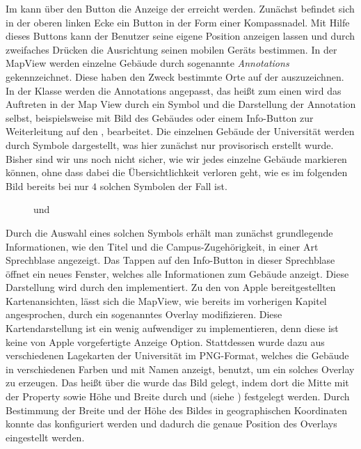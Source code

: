 \documentclass{report}
\begin{document}
Im  kann über den Button  die Anzeige der  erreicht werden. Zunächst befindet sich in der oberen linken Ecke ein Button in der Form einer Kompassnadel. Mit Hilfe dieses Buttons kann der Benutzer seine eigene Position anzeigen lassen und durch zweifaches Drücken die Ausrichtung seinen mobilen Geräts bestimmen. In der MapView werden einzelne Gebäude durch sogenannte \emph{Annotations} gekennzeichnet. Diese haben den Zweck bestimmte Orte auf der  auszuzeichnen. In der Klasse  werden die Annotations angepasst, das heißt zum einen wird das Auftreten in der Map View durch ein Symbol und die Darstellung der Annotation selbst, beispielsweise mit Bild des Gebäudes oder einem Info-Button zur Weiterleitung auf den , bearbeitet. Die einzelnen Gebäude der Universität werden durch Symbole dargestellt, was hier zunächst nur provisorisch erstellt wurde. Bisher sind wir uns noch nicht sicher, wie wir jedes einzelne Gebäude markieren können, ohne dass dabei die Übersichtlichkeit verloren geht, wie es im folgenden Bild bereits bei nur $4$ solchen Symbolen der Fall ist. 

\begin{figure}[ht]\label{bild_3}
\centering {}
\caption{ und }
\end{figure}

Durch die Auswahl eines solchen Symbols erhält man zunächst grundlegende Informationen, wie den Titel und die Campus-Zugehörigkeit, in einer Art Sprechblase angezeigt. Das Tappen auf den Info-Button in dieser Sprechblase öffnet ein neues Fenster, welches alle Informationen zum Gebäude anzeigt. Diese Darstellung wird durch den  implementiert. Zu den von Apple bereitgestellten Kartenansichten, lässt sich die MapView, wie bereits im vorherigen Kapitel angesprochen, durch ein sogenanntes Overlay modifizieren. Diese Kartendarstellung ist ein wenig aufwendiger zu implementieren, denn diese ist keine von Apple vorgefertigte Anzeige Option. Stattdessen wurde dazu aus verschiedenen Lagekarten der Universität im PNG-Format, welches die Gebäude in verschiedenen Farben und mit Namen anzeigt, benutzt, um ein solches Overlay zu erzeugen. Das heißt über die  wurde das Bild gelegt, indem dort die Mitte mit der Property  sowie Höhe und Breite durch  und  (siehe ) festgelegt werden. Durch Bestimmung der Breite  und der Höhe  des Bildes in geographischen Koordinaten konnte das  konfiguriert werden und dadurch die genaue Position des Overlays eingestellt werden. 
\end{document}
